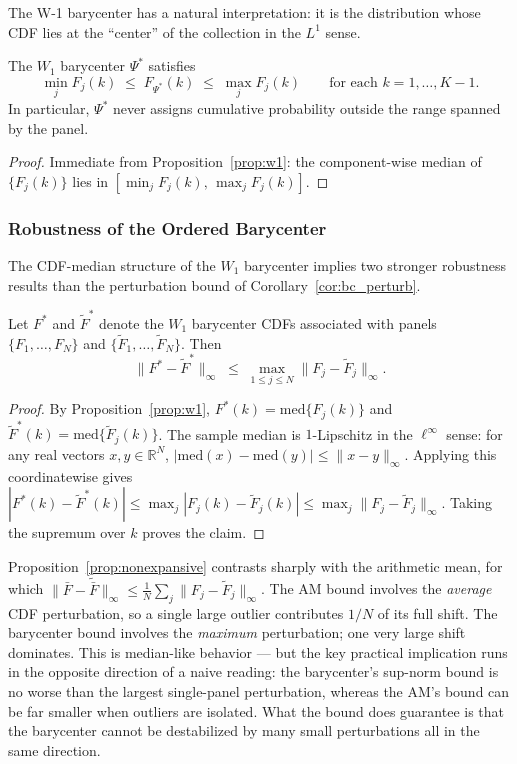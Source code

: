 The W-1 barycenter has a natural interpretation: it is the distribution whose CDF lies at the ``center'' of the collection in the $L^1$ sense.

\begin{corollary}
\label{cor:cdf_bounded}
The $W_1$ barycenter $\Psi^*$ satisfies
\[
  \min_{j} F_j(k) \;\leq\; F_{\Psi^*}(k) \;\leq\; \max_{j} F_j(k)
  \qquad \text{for each } k = 1,\ldots,K-1.
\]
In particular, $\Psi^*$ never assigns cumulative probability outside the range spanned by the panel.
\end{corollary}
\begin{proof}
Immediate from Proposition~\ref{prop:w1}: the component-wise median of $\{F_j(k)\}$ lies in $[\min_j F_j(k),\, \max_j F_j(k)]$.
\end{proof}

\subsubsection*{Robustness of the Ordered Barycenter}

The CDF-median structure of the $W_1$ barycenter implies two stronger robustness results than the perturbation bound of Corollary~\ref{cor:bc_perturb}.

\begin{proposition}
\label{prop:nonexpansive}
Let $F^*$ and $\tilde F^*$ denote the $W_1$ barycenter CDFs associated with panels $\{F_1,\ldots,F_N\}$ and $\{\tilde F_1,\ldots,\tilde F_N\}$.  Then
\[
  \|F^* - \tilde F^*\|_\infty \;\leq\; \max_{1\leq j\leq N}\|F_j - \tilde F_j\|_\infty.
\]
\end{proposition}
\begin{proof}
By Proposition~\ref{prop:w1}, $F^*(k) = \mathrm{med}\{F_j(k)\}$ and $\tilde F^*(k)=\mathrm{med}\{\tilde F_j(k)\}$.  The sample median is $1$-Lipschitz in the $\ell^\infty$ sense: for any real vectors $x,y\in\mathbb{R}^N$, $|\mathrm{med}(x) - \mathrm{med}(y)|\leq\|x-y\|_\infty$.  Applying this coordinatewise gives $|F^*(k)-\tilde F^*(k)|\leq\max_j|F_j(k)-\tilde F_j(k)|\leq\max_j\|F_j-\tilde F_j\|_\infty$.  Taking the supremum over $k$ proves the claim.
\end{proof}

\begin{remark}
Proposition~\ref{prop:nonexpansive} contrasts sharply with the arithmetic mean, for which $\|\bar F - \tilde{\bar F}\|_\infty \leq \frac{1}{N}\sum_j\|F_j-\tilde F_j\|_\infty$.  The AM bound involves the \emph{average} CDF perturbation, so a single large outlier contributes $1/N$ of its full shift.  The barycenter bound involves the \emph{maximum} perturbation; one very large shift dominates.  This is median-like behavior — but the key practical implication runs in the opposite direction of a naive reading: the barycenter's sup-norm bound is no worse than the largest single-panel perturbation, whereas the AM's bound can be far smaller when outliers are isolated.  What the bound does guarantee is that the barycenter cannot be destabilized by many small perturbations all in the same direction.
\end{remark}


